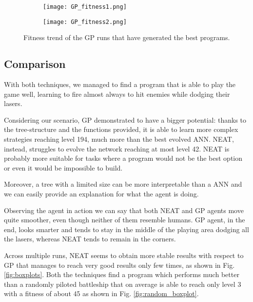 \begin{figure*}[t!]
    \centering
    \begin{subfigure}[b]{0.45\textwidth}
        \centerline{\texttt{[image: GP\_fitness1.png]}}
        \caption{}
        \label{fig:GP_fitness1}
    \end{subfigure}
    \hfill
    \begin{subfigure}[b]{0.45\textwidth}
        \centerline{\texttt{[image: GP\_fitness2.png]}}
        \caption{}
        \label{fig:GP_fitness2}
    \end{subfigure}
       \caption{Fitness trend of the GP runs that have generated the best programs.}
       \label{fig:GP_fitness}
\end{figure*}

\subsection{Comparison}
With both techniques, we managed to find a program that is able to play the game well,
learning to fire almost always to hit enemies while dodging their lasers.

Considering our scenario, GP demonstrated to have a bigger potential: thanks to the
tree-structure and the functions provided, it is able to learn more complex strategies
reaching level 194, much more than the best evolved ANN. NEAT, instead, struggles to
evolve the network reaching at most level 42. NEAT is probably more suitable for
tasks where a program would not be the best option or even it would be impossible
to build.

Moreover, a tree with a limited size can be more interpretable than a ANN and we can easily
provide an explanation for what the agent is doing.

Observing the agent in action we can say that both NEAT and GP agents move quite smoother, even though
neither of them resemble humans. GP agent, in the end, looks smarter and tends 
to stay in the middle of the playing area dodging all the lasers, whereas NEAT tends to
remain in the corners.

Across multiple runs, NEAT seems to obtain more stable results with respect to GP that 
manages to reach very good results only few times, as shown in Fig. \ref{fig:boxplots}. Both the techniques
find a program which performs much better than a randomly piloted battleship that on average is able 
to reach only level 3 with a fitness of about 45 as shown in Fig. \ref{fig:random_boxplot}.


